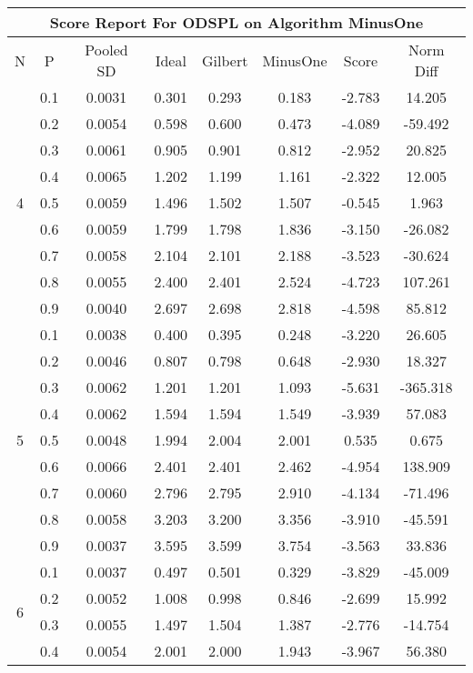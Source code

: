 \documentclass[11pt,a4paper]{report}
\begin{document}
\begin{longtable}{ | c | c || c | c | c | c | c | c | }
\hline
\multicolumn{8}{|c|}{ Score Report For ODSPL on Algorithm MinusOne} \\
\hline
N & P & Pooled SD &  Ideal &  Gilbert & MinusOne  & Score & Norm Diff \\
 \hline
 \hline
 \endhead
\multirow{9}{*}{4} & 0.1 & 0.0031 & 0.301 & 0.293 & 0.183 & -2.783 & 14.205 \\
 & 0.2 & 0.0054 & 0.598 & 0.600 & 0.473 & -4.089 & -59.492 \\
 & 0.3 & 0.0061 & 0.905 & 0.901 & 0.812 & -2.952 & 20.825 \\
 & 0.4 & 0.0065 & 1.202 & 1.199 & 1.161 & -2.322 & 12.005 \\
 & 0.5 & 0.0059 & 1.496 & 1.502 & 1.507 & -0.545 & 1.963 \\
 & 0.6 & 0.0059 & 1.799 & 1.798 & 1.836 & -3.150 & -26.082 \\
 & 0.7 & 0.0058 & 2.104 & 2.101 & 2.188 & -3.523 & -30.624 \\
 & 0.8 & 0.0055 & 2.400 & 2.401 & 2.524 & -4.723 & 107.261 \\
 & 0.9 & 0.0040 & 2.697 & 2.698 & 2.818 & -4.598 & 85.812 \\
 \hline
\multirow{9}{*}{5} & 0.1 & 0.0038 & 0.400 & 0.395 & 0.248 & -3.220 & 26.605 \\
 & 0.2 & 0.0046 & 0.807 & 0.798 & 0.648 & -2.930 & 18.327 \\
 & 0.3 & 0.0062 & 1.201 & 1.201 & 1.093 & -5.631 & -365.318 \\
 & 0.4 & 0.0062 & 1.594 & 1.594 & 1.549 & -3.939 & 57.083 \\
 & 0.5 & 0.0048 & 1.994 & 2.004 & 2.001 & 0.535 & 0.675 \\
 & 0.6 & 0.0066 & 2.401 & 2.401 & 2.462 & -4.954 & 138.909 \\
 & 0.7 & 0.0060 & 2.796 & 2.795 & 2.910 & -4.134 & -71.496 \\
 & 0.8 & 0.0058 & 3.203 & 3.200 & 3.356 & -3.910 & -45.591 \\
 & 0.9 & 0.0037 & 3.595 & 3.599 & 3.754 & -3.563 & 33.836 \\
 \hline
\multirow{9}{*}{6} & 0.1 & 0.0037 & 0.497 & 0.501 & 0.329 & -3.829 & -45.009 \\
 & 0.2 & 0.0052 & 1.008 & 0.998 & 0.846 & -2.699 & 15.992 \\
 & 0.3 & 0.0055 & 1.497 & 1.504 & 1.387 & -2.776 & -14.754 \\
 & 0.4 & 0.0054 & 2.001 & 2.000 & 1.943 & -3.967 & 56.380 \\

\end{longtable}
\end{document}

